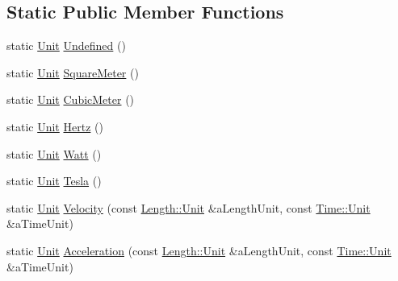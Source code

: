 \subsection*{Static Public Member Functions}
\begin{DoxyCompactItemize}
\item 
static \hyperlink{classostk_1_1physics_1_1units_1_1_derived_1_1_unit}{Unit} \hyperlink{classostk_1_1physics_1_1units_1_1_derived_1_1_unit_a4b85baf82b7fc1d7676cff81c5eca9f8}{Undefined} ()
\item 
static \hyperlink{classostk_1_1physics_1_1units_1_1_derived_1_1_unit}{Unit} \hyperlink{classostk_1_1physics_1_1units_1_1_derived_1_1_unit_a3788de147adef6a77d6f7e6df52e52ed}{Square\+Meter} ()
\item 
static \hyperlink{classostk_1_1physics_1_1units_1_1_derived_1_1_unit}{Unit} \hyperlink{classostk_1_1physics_1_1units_1_1_derived_1_1_unit_ab09e64a438371b55e7052c783a17bfb3}{Cubic\+Meter} ()
\item 
static \hyperlink{classostk_1_1physics_1_1units_1_1_derived_1_1_unit}{Unit} \hyperlink{classostk_1_1physics_1_1units_1_1_derived_1_1_unit_a051fe950e5c97188687c57a1bbcfce32}{Hertz} ()
\item 
static \hyperlink{classostk_1_1physics_1_1units_1_1_derived_1_1_unit}{Unit} \hyperlink{classostk_1_1physics_1_1units_1_1_derived_1_1_unit_a3267139d7ebe53de971fc1c4afa51ab2}{Watt} ()
\item 
static \hyperlink{classostk_1_1physics_1_1units_1_1_derived_1_1_unit}{Unit} \hyperlink{classostk_1_1physics_1_1units_1_1_derived_1_1_unit_a4a5940946d019226cf16ff24577ccfe4}{Tesla} ()
\item 
static \hyperlink{classostk_1_1physics_1_1units_1_1_derived_1_1_unit}{Unit} \hyperlink{classostk_1_1physics_1_1units_1_1_derived_1_1_unit_a460b5047c0da8a7e4901a6d5fdfe58f8}{Velocity} (const \hyperlink{classostk_1_1physics_1_1units_1_1_length_a2664470a7eedf5d45c88861fe69badea}{Length\+::\+Unit} \&a\+Length\+Unit, const \hyperlink{classostk_1_1physics_1_1units_1_1_time_aa961f0dbca7ec297e19e15e0dfa3bb4a}{Time\+::\+Unit} \&a\+Time\+Unit)
\item 
static \hyperlink{classostk_1_1physics_1_1units_1_1_derived_1_1_unit}{Unit} \hyperlink{classostk_1_1physics_1_1units_1_1_derived_1_1_unit_a930779ede3533f03279f5696f9b007b1}{Acceleration} (const \hyperlink{classostk_1_1physics_1_1units_1_1_length_a2664470a7eedf5d45c88861fe69badea}{Length\+::\+Unit} \&a\+Length\+Unit, const \hyperlink{classostk_1_1physics_1_1units_1_1_time_aa961f0dbca7ec297e19e15e0dfa3bb4a}{Time\+::\+Unit} \&a\+Time\+Unit)

\end{DoxyCompactItemize}
